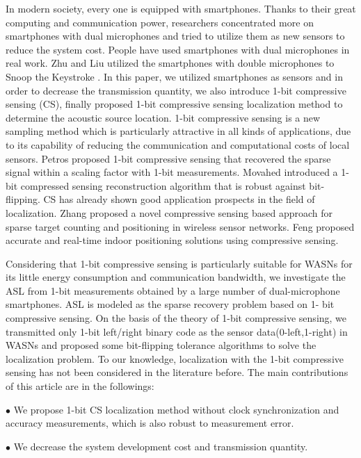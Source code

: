 \documentclass[journal]{IEEEtran}
\begin{document}
In modern society, every one is equipped with smartphones. Thanks to their great computing and communication power, researchers concentrated more on smartphones with dual microphones and tried to utilize them as new sensors to reduce the system cost. People have used smartphones with dual microphones in real work. Zhu and Liu utilized the smartphones with double microphones to Snoop the Keystroke\cite{zhu2014context} \cite{liu2015snooping}. In this paper, we utilized smartphones as sensors and in order to decrease the transmission quantity, we also introduce 1-bit compressive sensing (CS), finally proposed 1-bit compressive sensing localization method to determine the acoustic source location. 1-bit compressive sensing is a new sampling method which is particularly attractive in all kinds of applications, due to its capability of reducing the communication and computational costs of local sensors. Petros proposed 1-bit compressive sensing that recovered the sparse signal within a scaling factor with 1-bit measurements\cite{boufounos20081}. Movahed introduced a 1-bit compressed sensing reconstruction algorithm that is robust against bit-flipping\cite{movahed2012robust}. CS has already shown good application prospects in the field of localization. Zhang proposed a novel compressive sensing based approach for sparse target counting and positioning in wireless sensor networks\cite{zhang2011sparse}. Feng proposed accurate and real-time indoor positioning solutions using compressive sensing\cite{feng2010compressive}. 

Considering that 1-bit compressive sensing is particularly suitable for WASNs for its little energy consumption and communication bandwidth, we investigate the ASL from 1-bit measurements obtained by a large number of dual-microphone smartphones. ASL is modeled as the sparse recovery problem based on 1- bit compressive sensing. On the basis of the theory of 1-bit compressive sensing, we transmitted only 1-bit left/right binary code as the sensor data(0-left,1-right) in WASNs and proposed some bit-flipping tolerance algorithms to solve the localization problem. To our knowledge, localization with the 1-bit compressive sensing has not been considered in the literature before. The main contributions of this article are in the followings: 

$\bullet$ We propose 1-bit CS localization method without clock synchronization and accuracy measurements, which is also robust to measurement error. 

$\bullet$  We decrease the system development cost and transmission quantity.


  
\end{document}
